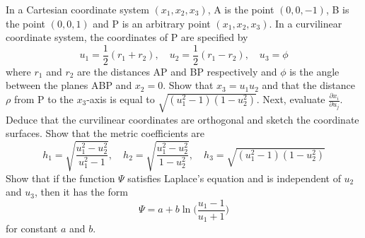 \documentclass[a4paper]{article}
\begin{document}
\begin{qns}
In a Cartesian coordinate system $(x_1,x_2,x_3)$, A is the point $(0, 0,-1)$, B is the point
$(0, 0, 1)$ and P is an arbitrary point $(x_1,x_2,x_3)$. In a curvilinear coordinate system, the coordinates of P are specified by
$$u_1=\frac{1}{2}(r_1+r_2),\quad u_2=\frac{1}{2}(r_1-r_2),\quad u_3=\phi$$
where $r_1$ and $r_2$ are the distances AP and BP respectively and $\phi$ is the angle between the planes ABP and $x_2=0$. Show that $x_3=u_1u_2$ and that the distance $\rho$ from P to the $x_3$-axis is equal to $\sqrt{(u_1^2-1)(1-u_2^2)}$. Next, evaluate $\frac{\partial x_i}{\partial u_j}$. Deduce that the curvilinear coordinates are orthogonal and sketch the coordinate surfaces. Show that the metric coefficients are
$$h_1=\sqrt{\frac{u_1^2-u_2^2}{u_1^2-1}},\quad h_2=\sqrt{\frac{u_1^2-u_2^2}{1-u_2^2}},\quad h_3=\sqrt{(u_1^2-1)(1-u_2^2)}$$
Show that if the function $\Psi$ satisfies Laplace's equation and is independent of $u_2$ and $u_3$, then it has the form
$$\Psi=a+b\ln\bigg(\frac{u_1-1}{u_1+1}\bigg)$$
for constant $a$ and $b$.
\end{qns}
\newpage
\end{document}
